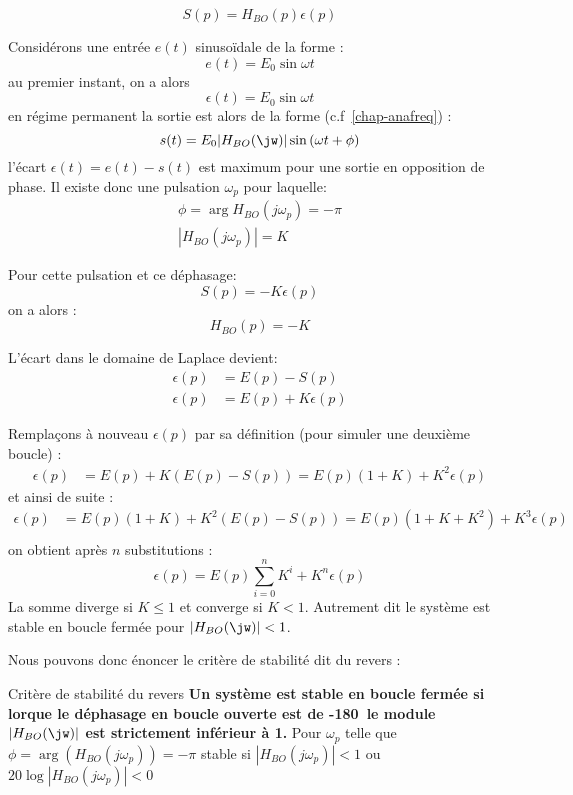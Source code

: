 $$
S(p)=H_{BO}(p)\epsilon(p)
$$

Considérons une entrée $e(t)$ sinuso\"idale de la forme :
$$
e(t)=E_0\sin{\omega t}
$$
au premier instant, on a alors 
$$
\epsilon(t)=E_0\sin{\omega t}
$$
en régime permanent la sortie est alors de la forme (c.f~\cref{chap-anafreq}) :
$$
s(t)=E_0|H_{BO}(\jw)|\sin{(\omega t+\phi)}
$$
l'écart $\epsilon(t)=e(t)-s(t)$ est maximum pour une sortie en opposition 
de phase. Il existe donc une pulsation $\omega_p$ pour laquelle:
\begin{align*}
    \phi=\arg{H_{BO}(j\omega_p)}=-\pi\\
    |H_{BO}(j\omega_p)|=K    
\end{align*}

Pour cette pulsation et ce déphasage: 
$$
S(p)=-K\epsilon(p)
$$
on a alors :
$$
H_{BO}(p)=-K
$$

L'écart dans le domaine de Laplace devient:
\begin{align*}
    \epsilon(p)&=E(p)-S(p)\\
    \epsilon(p)&=E(p)+K\epsilon(p)
\end{align*}

Remplaçons à nouveau $\epsilon(p)$ par sa définition (pour simuler une 
deuxième boucle) : 
\begin{align*}
    \epsilon(p)&=E(p)+K(E(p)-S(p))=E(p)(1+K)+K^2\epsilon(p)
\end{align*}
et ainsi de suite :
\begin{align*}
    \epsilon(p)&=E(p)(1+K)+K^2\left(E(p)-S(p)\right)
                =E(p)(1+K+K^2)+K^3\epsilon(p)\\
\end{align*}
on obtient après $n$ substitutions :
$$
\epsilon(p)=E(p)\sum_{i=0}^{n}K^i+K^n\epsilon(p)
$$
La somme diverge si $K\leq1$ et converge si $K<1$. 
Autrement dit le système est stable en boucle fermée pour $|H_{BO}(\jw)|<1$.

Nous pouvons donc énoncer le critère de stabilité dit du revers :

\begin{criteria}{Critère de stabilité du revers}
    \textbf{Un système est stable en boucle fermée si lorque le 
    déphasage en boucle ouverte est de -180\degree~le module $|H_{BO}(\jw)|$ 
    est strictement inférieur à 1.}
    Pour $\omega_p$ telle que $\phi=\arg{\left(H_{BO}(j\omega_p)\right)}=-\pi$ 
    stable si  $|H_{BO}(j\omega_p)|<1$ ou $20\log{|H_{BO}(j\omega_p)|}<0$ 
\end{criteria}

